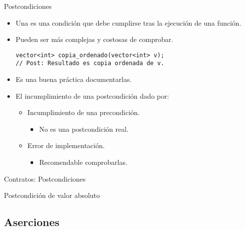 \begin{frame}[t,fragile]{Postcondiciones}
\begin{itemize}
  \item Una  es una condición que debe cumplirse tras
        la ejecución de una función.

  \item Pueden ser más complejas y costosas de comprobar.
\begin{lstlisting}
vector<int> copia_ordenado(vector<int> v);
// Post: Resultado es copia ordenada de v.
\end{lstlisting}

  \item Es una buena práctica documentarlas.

  \item El incumplimiento de una postcondición dado por:
    \begin{itemize}
      \item Incumplimiento de una precondición.
        \begin{itemize}
          \item No es una postcondición real.
        \end{itemize}
      \item Error de implementación.
        \begin{itemize}
          \item Recomendable comprobarlas.
        \end{itemize}
    \end{itemize}
\end{itemize}
\end{frame}

\begin{frame}[t]{Contratos: Postcondiciones}
\begin{block}{Postcondición de valor absoluto}

\end{block}
\end{frame}

\subsection{Aserciones}

